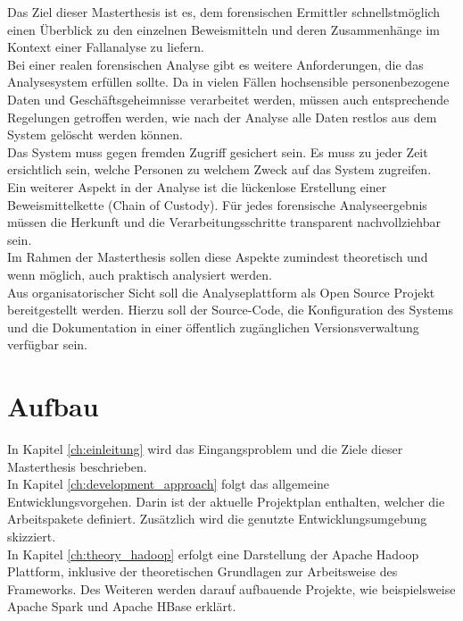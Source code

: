 \noindent
Das Ziel dieser Masterthesis ist es, dem forensischen Ermittler schnellstmöglich einen Überblick zu den einzelnen Beweismitteln und deren Zusammenhänge im Kontext einer Fallanalyse zu liefern. \\

\noindent
Bei einer realen forensischen Analyse gibt es weitere Anforderungen, die das Analysesystem erfüllen sollte. Da in vielen Fällen hochsensible personenbezogene Daten und Geschäftsgeheimnisse verarbeitet werden, müssen auch entsprechende Regelungen getroffen werden, wie nach der Analyse alle Daten restlos aus dem System gelöscht werden können.\\
Das System muss gegen fremden Zugriff gesichert sein. Es muss zu jeder Zeit ersichtlich sein, welche Personen zu welchem Zweck auf das System zugreifen.\\
Ein weiterer Aspekt in der Analyse ist die lückenlose Erstellung einer Beweismittelkette (Chain of Custody). Für jedes forensische Analyseergebnis müssen die Herkunft und die Verarbeitungsschritte transparent nachvollziehbar sein.\\
Im Rahmen der Masterthesis sollen diese Aspekte zumindest theoretisch und wenn möglich, auch praktisch analysiert werden.\\

\noindent
Aus organisatorischer Sicht soll die Analyseplattform als Open Source Projekt bereitgestellt werden. Hierzu soll der Source-Code, die Konfiguration des Systems und die Dokumentation in einer öffentlich zugänglichen Versionsverwaltung verfügbar sein.\\


\clearpage
\section{Aufbau}
In Kapitel \ref{ch:einleitung} wird das Eingangsproblem und die Ziele dieser Masterthesis beschrieben.\\ 

\noindent
In Kapitel \ref{ch:development_approach} folgt das allgemeine Entwicklungsvorgehen. Darin ist der aktuelle Projektplan enthalten, welcher die Arbeitspakete definiert.
Zusätzlich wird die genutzte Entwicklungsumgebung skizziert.\\

\noindent
In Kapitel \ref{ch:theory_hadoop} erfolgt eine Darstellung der Apache Hadoop Plattform, inklusive der theoretischen Grundlagen zur Arbeitsweise des Frameworks. Des Weiteren werden darauf aufbauende Projekte, wie beispielsweise Apache Spark und Apache HBase erklärt.\\

